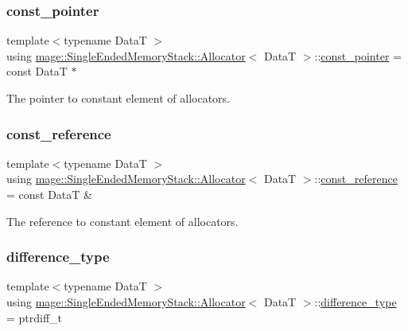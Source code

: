 \subsubsection{\texorpdfstring{const\+\_\+pointer}{const\_pointer}}
{\footnotesize\ttfamily template$<$typename DataT $>$ \\
using \hyperlink{structmage_1_1_single_ended_memory_stack_1_1_allocator}{mage\+::\+Single\+Ended\+Memory\+Stack\+::\+Allocator}$<$ DataT $>$\+::\hyperlink{structmage_1_1_single_ended_memory_stack_1_1_allocator_aaa595b8cfde6f045e5f87e5662b549f6}{const\+\_\+pointer} =  const DataT $\ast$}

The pointer to constant element of allocators. \hypertarget{structmage_1_1_single_ended_memory_stack_1_1_allocator_afe1303b90c8f68366f5c88e9a77d12c0}{}\label{structmage_1_1_single_ended_memory_stack_1_1_allocator_afe1303b90c8f68366f5c88e9a77d12c0} 
\subsubsection{\texorpdfstring{const\+\_\+reference}{const\_reference}}
{\footnotesize\ttfamily template$<$typename DataT $>$ \\
using \hyperlink{structmage_1_1_single_ended_memory_stack_1_1_allocator}{mage\+::\+Single\+Ended\+Memory\+Stack\+::\+Allocator}$<$ DataT $>$\+::\hyperlink{structmage_1_1_single_ended_memory_stack_1_1_allocator_afe1303b90c8f68366f5c88e9a77d12c0}{const\+\_\+reference} =  const DataT \&}

The reference to constant element of allocators. \hypertarget{structmage_1_1_single_ended_memory_stack_1_1_allocator_aebd7e5c612fbd49aea979bb115911359}{}\label{structmage_1_1_single_ended_memory_stack_1_1_allocator_aebd7e5c612fbd49aea979bb115911359} 
\subsubsection{\texorpdfstring{difference\+\_\+type}{difference\_type}}
{\footnotesize\ttfamily template$<$typename DataT $>$ \\
using \hyperlink{structmage_1_1_single_ended_memory_stack_1_1_allocator}{mage\+::\+Single\+Ended\+Memory\+Stack\+::\+Allocator}$<$ DataT $>$\+::\hyperlink{structmage_1_1_single_ended_memory_stack_1_1_allocator_aebd7e5c612fbd49aea979bb115911359}{difference\+\_\+type} =  ptrdiff\+\_\+t}

